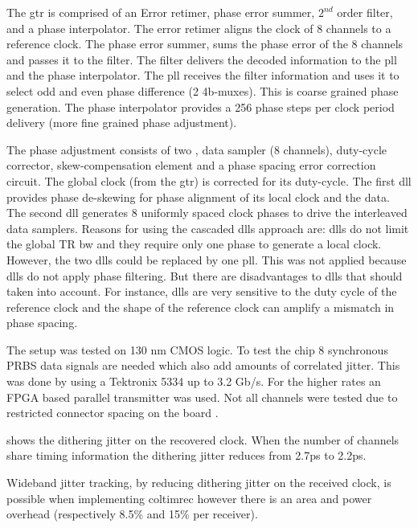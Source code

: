 The \ac{gtr} is comprised of an Error retimer, phase error summer, $2^{nd}$ order filter,  and a phase interpolator.
The error retimer aligns the clock of 8 channels to a reference clock.
The phase error summer, sums the phase error of the 8 channels and passes it to the filter.
The filter delivers the decoded information to the \ac{pll} and the phase interpolator.
The \ac{pll} receives the filter information and uses it to select odd and even phase difference (2 4b-muxes).
This is coarse grained phase generation.
The phase interpolator provides a 256 phase steps per clock period delivery (more fine grained phase adjustment).

The phase adjustment consists of two , data sampler (8 channels), duty-cycle corrector, skew-compensation element and a phase spacing error correction circuit.
The global clock (from the \ac{gtr}) is corrected for its duty-cycle.
The first \ac{dll} provides phase de-skewing for phase alignment of its local clock and the data.
The second \ac{dll} generates 8 uniformly spaced clock phases to drive the interleaved data samplers. %
Reasons for using the cascaded \acsp{dll} approach are: \acsp{dll} do not limit the global TR \ac{bw} and they require only one phase to generate a local clock.
However, the two \acsp{dll} could be replaced by one \ac{pll}.
This was not applied because \acsp{dll} do not apply phase filtering. 
But there are disadvantages to \acsp{dll} that should taken into account.
For instance, \acsp{dll} are very sensitive to the duty cycle of the reference clock and the shape of the reference clock can amplify a mismatch in phase spacing.

The setup was tested on 130 nm CMOS logic. 
To test the chip 8 synchronous PRBS data signals are needed which also add amounts of correlated jitter.
This was done by using a Tektronix 5334 up to 3.2 Gb/s.
For the higher rates an FPGA based parallel transmitter was used.
Not all channels were tested due to restricted connector spacing on the board .

 shows the dithering jitter on the recovered clock. 
When the number of channels share timing information the dithering jitter reduces from 2.7ps to 2.2ps.

Wideband jitter tracking, by reducing dithering jitter on the received clock, is possible when implementing \ac{coltimrec} however there is an area and power overhead (respectively 8.5\% and 15\% per receiver).


